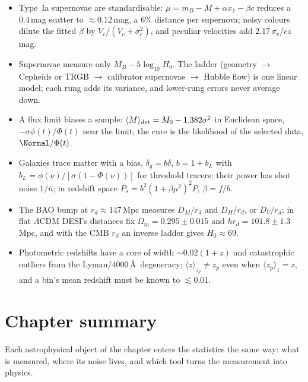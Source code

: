 \begin{recap}
\begin{itemize}[itemsep=1pt]
  \item Type~Ia supernovae are standardisable: $\mu=m_B-M+\alpha x_1-\beta c$ reduces a $0.4$\,mag scatter to $\approx0.12$\,mag, a $6\%$ distance per supernova; noisy colours dilute the fitted $\beta$ by $V_c/(V_c+\sigma_c^2)$, and peculiar velocities add $2.17\,\sigma_v/cz$\,mag.
  \item Supernovae measure only $M_B-5\log_{10}H_0$. The ladder (geometry $\to$ Cepheids or TRGB $\to$ calibrator supernovae $\to$ Hubble flow) is one linear model; each rung adds its variance, and lower-rung errors never average down.
  \item A flux limit biases a sample: $\langle M\rangle_{\rm det}=M_0-1.382\sigma^2$ in Euclidean space, $-\sigma\phi(t)/\Phi(t)$ near the limit; the cure is the likelihood of the selected data, $\Normal/\Phi(t)$.
  \item Galaxies trace matter with a bias, $\delta_g=b\delta$, $b=1+b_L$ with $b_L=\phi(\nu)/[\sigma(1-\Phi(\nu))]$ for threshold tracers; their power has shot noise $1/\bar n$; in redshift space $P_s=b^2(1+\beta\mu^2)^2P$, $\beta=f/b$.
  \item The BAO bump at $r_d\approx147$\,Mpc measures $D_M/r_d$ and $D_H/r_d$, or $D_V/r_d$; in flat $\Lambda$CDM DESI's distances fix $\Omega_m=0.295\pm0.015$ and $hr_d=101.8\pm1.3$\,Mpc, and with the CMB $r_d$ an inverse ladder gives $H_0\approx69$.
  \item Photometric redshifts have a core of width $\sim0.02(1+z)$ and catastrophic outliers from the Lyman/$4000$\,\AA\ degeneracy; $\langle z\rangle_{z_p}\ne z_p$ even when $\langle z_p\rangle_z=z$, and a bin's mean redshift must be known to $\lesssim0.01$.
\end{itemize}
\end{recap}

\section*{Chapter summary}
\label{T2b:sec:summary}

Each astrophysical object of the chapter enters the statistics the same way: what is measured, where its noise lives, and which tool turns the measurement into physics.

